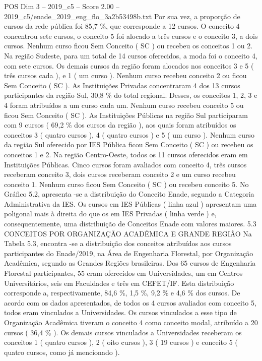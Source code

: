 \begin{textsample}{POS Dim 3 – 2019\_c5 – Score 2.00 – 2019\_c5/enade\_2019\_eng\_flo\_3a2b53498b.txt}
Por sua vez, a proporção de cursos da rede pública foi 85,7 \%, que corresponde a 12 cursos.
O conceito 4 concentrou sete cursos, o conceito 5 foi alocado a três cursos e o conceito 3, a dois cursos.
Nenhum curso ficou Sem Conceito ( SC ) ou recebeu os conceitos 1 ou 2.
Na região Sudeste, para um total de 14 cursos oferecidos, a moda foi o conceito 4, com sete cursos.
Os demais cursos da região foram alocados nos conceitos 3 e 5 ( três cursos cada ), e 1 ( um curso ).
Nenhum curso recebeu conceito 2 ou ficou Sem Conceito ( SC ).
As Instituições Privadas concentraram 4 dos 13 cursos participantes da região Sul, 30,8 \% do total regional.
Desses, os conceitos 1, 2, 3 e 4 foram atribuídos a um curso cada um.
Nenhum curso recebeu conceito 5 ou ficou Sem Conceito ( SC ).
As Instituições Públicas na região Sul participaram com 9 cursos ( 69,2 \% dos cursos da região ), aos quais foram atribuídos os conceitos 3 ( quatro cursos ), 4 ( quatro cursos ) e 5 ( um curso ).
Nenhum curso da região Sul oferecido por IES Pública ficou Sem Conceito ( SC ) ou recebeu os conceitos 1 e 2.
Na região Centro-Oeste, todos os 11 cursos oferecidos eram em Instituições Públicas.
Cinco cursos foram avaliados com conceito 4, três cursos receberam conceito 3, dois cursos receberam conceito 2 e um curso recebeu conceito 1.
Nenhum curso ficou Sem Conceito ( SC ) ou recebeu conceito 5.
No Gráfico 5.2, apresenta -se a distribuição do Conceito Enade, segundo a Categoria Administrativa da IES.
Os cursos em IES Públicas ( linha azul ) apresentam uma poligonal mais à direita do que os em IES Privadas ( linha verde ) e, consequentemente, uma distribuição de Conceitos Enade com valores maiores. 5.3 CONCEITOS POR ORGANIZAÇÃO ACADÊMICA E GRANDE REGIÃO Na Tabela 5.3, encontra -se a distribuição dos conceitos atribuídos aos cursos participantes do Enade/2019, na Área de Engenharia Florestal, por Organização Acadêmica, segundo as Grandes Regiões brasileiras.
Dos 65 cursos de Engenharia Florestal participantes, 55 eram oferecidos em Universidades, um em Centros Universitários, seis em Faculdades e três em CEFET/IF.
Esta distribuição corresponde a, respectivamente, 84,6 \%, 1,5 \%, 9,2 \% e 4,6 \% dos cursos.
De acordo com os dados apresentados, de todos os 4 cursos avaliados com conceito 5, todos eram vinculados a Universidades.
Os cursos vinculados a esse tipo de Organização Acadêmica tiveram o conceito 4 como conceito modal, atribuído a 20 cursos ( 36,4 \% ).
Os demais cursos vinculados a Universidades receberam os conceitos 1 ( quatro cursos ), 2 ( oito cursos ), 3 ( 19 cursos ) e conceito 5 ( quatro cursos, como já mencionado ).

\end{textsample}
